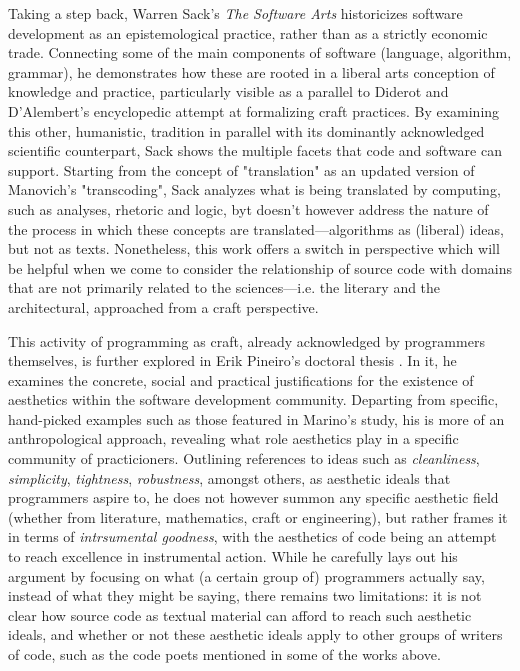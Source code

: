 Taking a step back, Warren Sack's \emph{The Software Arts} \citep{sack_software_2019} historicizes software development as an epistemological practice, rather than as a strictly economic trade. Connecting some of the main components of software (language, algorithm, grammar), he demonstrates how these are rooted in a liberal arts conception of knowledge and practice, particularly visible as a parallel to Diderot and D'Alembert's encyclopedic attempt at formalizing craft practices. By examining this other, humanistic, tradition in parallel with its dominantly acknowledged scientific counterpart, Sack shows the multiple facets that code and software can support. Starting from the concept of "translation" as an updated version of Manovich's "transcoding", Sack analyzes what is being translated by computing, such as analyses, rhetoric and logic, byt doesn't however address the nature of the process in which these concepts are translated—algorithms as (liberal) ideas, but not as texts. Nonetheless, this work offers a switch in perspective which will be helpful when we come to consider the relationship of source code with domains that are not primarily related to the sciences—i.e. the literary and the architectural, approached from a craft perspective.

This activity of programming as craft, already acknowledged by programmers themselves, is further explored in Erik Pineiro's doctoral thesis \citep{pineiro_aesthetics_2003}. In it, he examines the concrete, social and practical justifications for the existence of aesthetics within the software development community. Departing from specific, hand-picked examples such as those featured in Marino's study, his is more of an anthropological approach, revealing what role aesthetics play in a specific community of practicioners. Outlining references to ideas such as \emph{cleanliness}, \emph{simplicity}, \emph{tightness}, \emph{robustness}, amongst others, as aesthetic ideals that programmers aspire to, he does not however summon any specific aesthetic field (whether from literature, mathematics, craft or engineering), but rather frames it in terms of \emph{intrsumental goodness}, with the aesthetics of code being an attempt to reach excellence in instrumental action. While he carefully lays out his argument by focusing on what (a certain group of) programmers actually say, instead of what they might be saying, there remains two limitations: it is not clear how source code as textual material can afford to reach such aesthetic ideals, and whether or not these aesthetic ideals apply to other groups of writers of code, such as the code poets mentioned in some of the works above.

